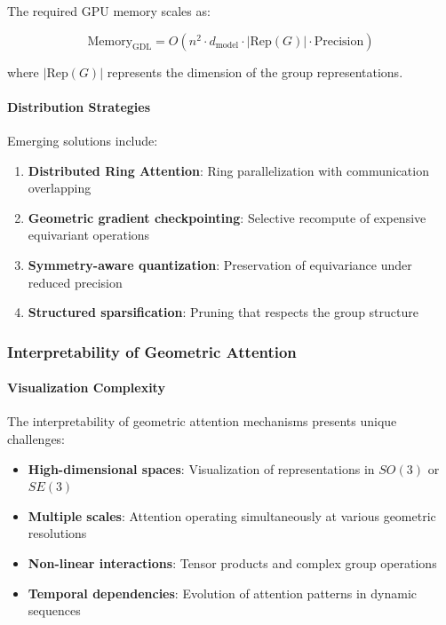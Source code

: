 The required GPU memory scales as:

\begin{equation}
\text{Memory}_{\text{GDL}} = O(n^2 \cdot d_{\text{model}} \cdot |\text{Rep}(G)| \cdot \text{Precision})
\label{eq:gdl_memory_scaling}
\end{equation}

where $|\text{Rep}(G)|$ represents the dimension of the group representations.

\paragraph{Distribution Strategies}

Emerging solutions include:

\begin{enumerate}
    \item \textbf{Distributed Ring Attention}: Ring parallelization with communication overlapping
    \item \textbf{Geometric gradient checkpointing}: Selective recompute of expensive equivariant operations
    \item \textbf{Symmetry-aware quantization}: Preservation of equivariance under reduced precision
    \item \textbf{Structured sparsification}: Pruning that respects the group structure
\end{enumerate}

\subsubsection{Interpretability of Geometric Attention}

\paragraph{Visualization Complexity}

The interpretability of geometric attention mechanisms presents unique challenges:

\begin{itemize}
    \item \textbf{High-dimensional spaces}: Visualization of representations in $SO(3)$ or $SE(3)$
    \item \textbf{Multiple scales}: Attention operating simultaneously at various geometric resolutions
    \item \textbf{Non-linear interactions}: Tensor products and complex group operations
    \item \textbf{Temporal dependencies}: Evolution of attention patterns in dynamic sequences
\end{itemize}

